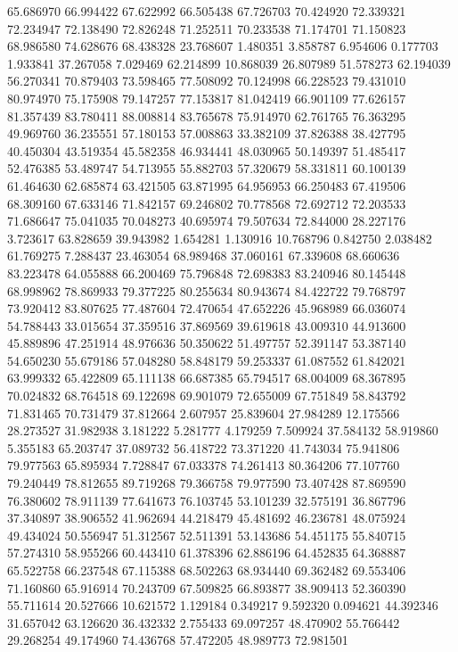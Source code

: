 65.686970
66.994422
67.622992
66.505438
67.726703
70.424920
72.339321
72.234947
72.138490
72.826248
71.252511
70.233538
71.174701
71.150823
68.986580
74.628676
68.438328
23.768607
1.480351
3.858787
6.954606
0.177703
1.933841
37.267058
7.029469
62.214899
10.868039
26.807989
51.578273
62.194039
56.270341
70.879403
73.598465
77.508092
70.124998
66.228523
79.431010
80.974970
75.175908
79.147257
77.153817
81.042419
66.901109
77.626157
81.357439
83.780411
88.008814
83.765678
75.914970
62.761765
76.363295
49.969760
36.235551
57.180153
57.008863
33.382109
37.826388
38.427795
40.450304
43.519354
45.582358
46.934441
48.030965
50.149397
51.485417
52.476385
53.489747
54.713955
55.882703
57.320679
58.331811
60.100139
61.464630
62.685874
63.421505
63.871995
64.956953
66.250483
67.419506
68.309160
67.633146
71.842157
69.246802
70.778568
72.692712
72.203533
71.686647
75.041035
70.048273
40.695974
79.507634
72.844000
28.227176
3.723617
63.828659
39.943982
1.654281
1.130916
10.768796
0.842750
2.038482
61.769275
7.288437
23.463054
68.989468
37.060161
67.339608
68.660636
83.223478
64.055888
66.200469
75.796848
72.698383
83.240946
80.145448
68.998962
78.869933
79.377225
80.255634
80.943674
84.422722
79.768797
73.920412
83.807625
77.487604
72.470654
47.652226
45.968989
66.036074
54.788443
33.015654
37.359516
37.869569
39.619618
43.009310
44.913600
45.889896
47.251914
48.976636
50.350622
51.497757
52.391147
53.387140
54.650230
55.679186
57.048280
58.848179
59.253337
61.087552
61.842021
63.999332
65.422809
65.111138
66.687385
65.794517
68.004009
68.367895
70.024832
68.764518
69.122698
69.901079
72.655009
67.751849
58.843792
71.831465
70.731479
37.812664
2.607957
25.839604
27.984289
12.175566
28.273527
31.982938
3.181222
5.281777
4.179259
7.509924
37.584132
58.919860
5.355183
65.203747
37.089732
56.418722
73.371220
41.743034
75.941806
79.977563
65.895934
7.728847
67.033378
74.261413
80.364206
77.107760
79.240449
78.812655
89.719268
79.366758
79.977590
73.407428
87.869590
76.380602
78.911139
77.641673
76.103745
53.101239
32.575191
36.867796
37.340897
38.906552
41.962694
44.218479
45.481692
46.236781
48.075924
49.434024
50.556947
51.312567
52.511391
53.143686
54.451175
55.840715
57.274310
58.955266
60.443410
61.378396
62.886196
64.452835
64.368887
65.522758
66.237548
67.115388
68.502263
68.934440
69.362482
69.553406
71.160860
65.916914
70.243709
67.509825
66.893877
38.909413
52.360390
55.711614
20.527666
10.621572
1.129184
0.349217
9.592320
0.094621
44.392346
31.657042
63.126620
36.432332
2.755433
69.097257
48.470902
55.766442
29.268254
49.174960
74.436768
57.472205
48.989773
72.981501
